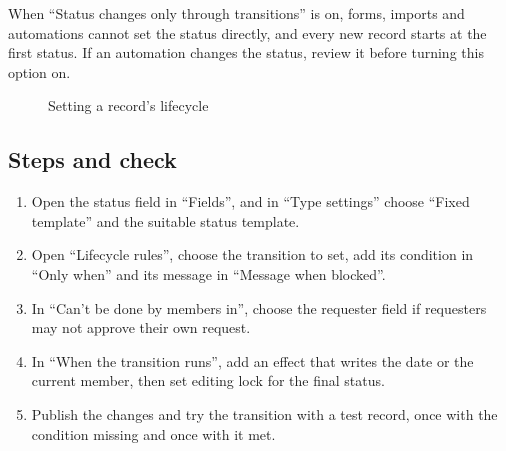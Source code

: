 \begin{rcwarn}
When “Status changes only through transitions” is on, forms, imports and automations cannot set the status directly, and every new record starts at the first status. If an automation changes the status, review it before turning this option on.
\end{rcwarn}

\begin{figure}[H]
\centering
{}
\rclegend
\caption{Setting a record's lifecycle}
\label{fig:builder-lifecycle-flow}
\end{figure}

\subsection{Steps and check}
\begin{enumerate}
\item Open the status field in “Fields”, and in “Type settings” choose “Fixed template” and the suitable status template.
\item Open “Lifecycle rules”, choose the transition to set, add its condition in “Only when” and its message in “Message when blocked”.
\item In “Can't be done by members in”, choose the requester field if requesters may not approve their own request.
\item In “When the transition runs”, add an effect that writes the date or the current member, then set editing lock for the final status.
\item Publish the changes and try the transition with a test record, once with the condition missing and once with it met.
\end{enumerate}

